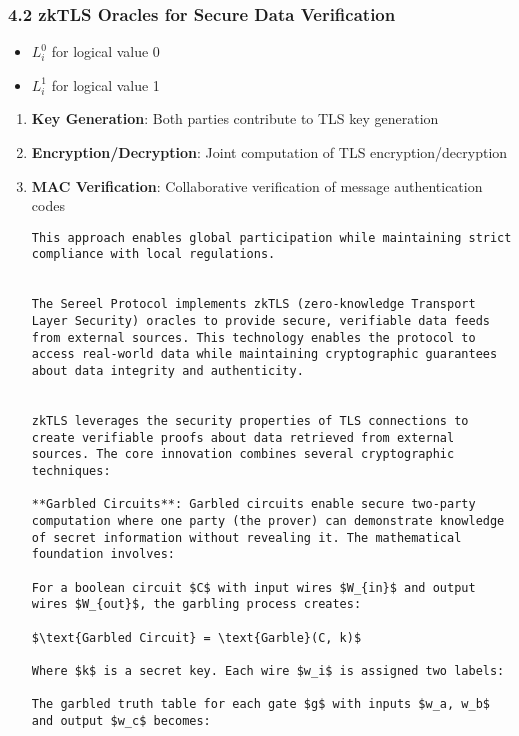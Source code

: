 \documentclass[12pt]{article}
\begin{document}
\subsubsection{4.2 zkTLS Oracles for Secure Data Verification} %
\begin{itemize}
	\item $L_i^0$ for logical value 0
	\item $L_i^1$ for logical value 1

\end{itemize}
\begin{enumerate}
	\item \textbf{Key Generation}: Both parties contribute to TLS key generation
	\item \textbf{Encryption/Decryption}: Joint computation of TLS encryption/decryption
	\item \textbf{MAC Verification}: Collaborative verification of message authentication codes

\begin{lstlisting}
This approach enables global participation while maintaining strict compliance with local regulations.


The Sereel Protocol implements zkTLS (zero-knowledge Transport Layer Security) oracles to provide secure, verifiable data feeds from external sources. This technology enables the protocol to access real-world data while maintaining cryptographic guarantees about data integrity and authenticity.


zkTLS leverages the security properties of TLS connections to create verifiable proofs about data retrieved from external sources. The core innovation combines several cryptographic techniques:

**Garbled Circuits**: Garbled circuits enable secure two-party computation where one party (the prover) can demonstrate knowledge of secret information without revealing it. The mathematical foundation involves:

For a boolean circuit $C$ with input wires $W_{in}$ and output wires $W_{out}$, the garbling process creates:

$\text{Garbled Circuit} = \text{Garble}(C, k)$

Where $k$ is a secret key. Each wire $w_i$ is assigned two labels:

The garbled truth table for each gate $g$ with inputs $w_a, w_b$ and output $w_c$ becomes:


\end{lstlisting}
\end{enumerate}
\end{document}
